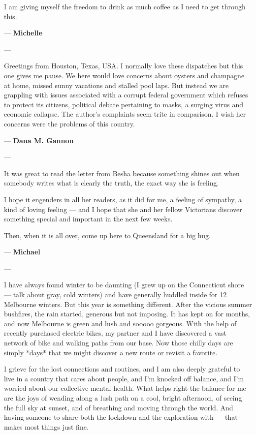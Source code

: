 I am giving myself the freedom to drink as much coffee as I need to get
through this.

--- \textbf{Michelle}

---

Greetings from Houston, Texas, USA. I normally love these dispatches but
this one gives me pause. We here would love concerns about oysters and
champagne at home, missed sunny vacations and stalled pool laps. But
instead we are grappling with issues associated with a corrupt federal
government which refuses to protect its citizens, political debate
pertaining to masks, a surging virus and economic collapse. The author's
complaints seem trite in comparison. I wish her concerns were the
problems of this country.

--- \textbf{Dana M. Gannon}

---

It was great to read the letter from Besha because something shines out
when somebody writes what is clearly the truth, the exact way she is
feeling.

I hope it engenders in all her readers, as it did for me, a feeling of
sympathy, a kind of loving feeling --- and I hope that she and her
fellow Victorians discover something special and important in the next
few weeks.

Then, when it is all over, come up here to Queensland for a big hug.

--- \textbf{Michael}

---

I have always found winter to be daunting (I grew up on the Connecticut
shore --- talk about gray, cold winters) and have generally huddled
inside for 12 Melbourne winters. But this year is something different.
After the vicious summer bushfires, the rain started, generous but not
imposing. It has kept on for months, and now Melbourne is green and lush
and sooooo gorgeous. With the help of recently purchased electric bikes,
my partner and I have discovered a vast network of bike and walking
paths from our base. Now those chilly days are simply *days* that we
might discover a new route or revisit a favorite.

I grieve for the lost connections and routines, and I am also deeply
grateful to live in a country that cares about people, and I'm knocked
off balance, and I'm worried about our collective mental health. What
helps right the balance for me are the joys of wending along a lush path
on a cool, bright afternoon, of seeing the full sky at sunset, and of
breathing and moving through the world. And having someone to share both
the lockdown and the exploration with --- that makes most things just
fine.

